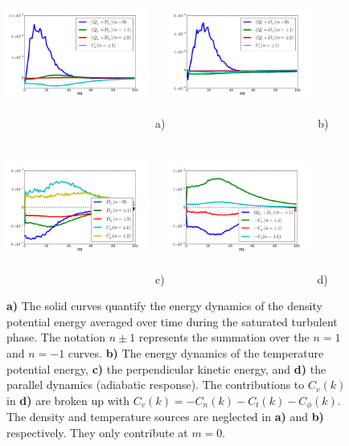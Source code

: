 \documentclass[showpacs,preprintnumbers,amsmath,amssymb,superscriptaddress]{revtex4}
\begin{document}
\begin{figure}
\includegraphics[width=0.42\textwidth,height=50mm]{density_dynamics}~a)
\hfil
\includegraphics[width=0.42\textwidth,height=50mm]{temperature_dynamics}~b)
\hfil
\includegraphics[width=0.42\textwidth,height=50mm]{potential_dynamics}~c)
\hfil
\includegraphics[width=0.42\textwidth,height=50mm]{parallel_dynamics}~d)
\hfil
\caption{\textbf{a)} The solid curves quantify the energy dynamics of the density potential energy averaged over time during the saturated turbulent phase. The notation $n \pm 1$ represents the
summation over the $n=1$ and $n=-1$ curves. \textbf{b)} The energy dynamics of the temperature potential energy, \textbf{c)} the perpendicular kinetic energy, and \textbf{d)} the parallel
dynamics (adiabatic response). The contributions to $C_v(k)$ in \textbf{d)} are broken up with $C_v(k) = -C_n(k) - C_t(k) - C_\phi(k)$. 
The density and temperature sources are neglected in \textbf{a)} and \textbf{b)} respectively. They only contribute at $m=0$.}
\label{nc_dynamics_figures}
\end{figure}
\end{document}
